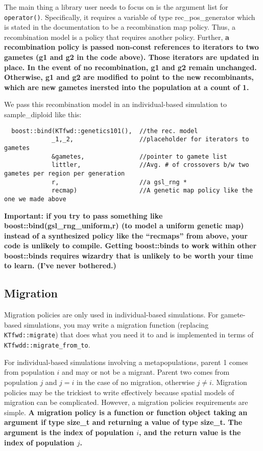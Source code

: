 \documentclass{article}
\begin{document}
The main thing a library user needs to focus on is the argument list for \texttt{operator()}.  Specifically, it requires a variable of type rec\_pos\_generator which is stated in the documentation to be a recombination map policy. Thus, a recombination model is a policy that requires another policy.  Further, \textbf{a recombination policy is passed non-const references to iterators to two gametes (g1 and g2 in the code above). Those iterators are updated in place.  In the event of no recombination, g1 and g2 remain unchanged.  Otherwise, g1 and g2 are modified to point to the new recombinants, which are new gametes inersted into the population at a count of 1.}

We pass this recombination model in an individual-based simulation to sample\_diploid like this:

\begin{lstlisting}
  boost::bind(KTfwd::genetics101(),  //the rec. model
             _1,_2,                  //placeholder for iterators to gametes
             &gametes,               //pointer to gamete list
             littler,                //Avg. # of crossovers b/w two gametes per region per generation
             r,                      //a gsl_rng *
             recmap)                 //A genetic map policy like the one we made above
\end{lstlisting}

\textbf{Important: if you try to pass something like boost::bind(gsl\_rng\_uniform,r) (to model a uniform genetic map) instead of a synthesized policy like the ``recmaps'' from above, your code is unlikely to compile.  Getting boost::binds to work within other boost::binds requires wizardry that is unlikely to be worth your time to learn.  (I've never bothered.)}
\subsection{Migration}
Migration policies are only used in individual-based simulations.  For gamete-based simulations, you may write a migration function (replacing \texttt{KTfwd::migrate}) that does what you need it to and is implemented in terms of \texttt{KTfwdd::migrate\_from\_to}.

For individual-based simulations involving a metapopulations, parent 1 comes from population $i$ and may or not be a migrant.  Parent two comes from population $j$ and $j = i$ in the case of no migration, otherwise $j \neq i$.  Migration policies may be the trickiest to write effectively because spatial models of migration can be complicated.  However, a migration policies requirements are simple.  \textbf{A migration policy is a function or function object taking an argument if type size\_t and returning a value of type size\_t.  The argument is the index of population $i$, and the return value is the index of population $j$.}
\end{document}
